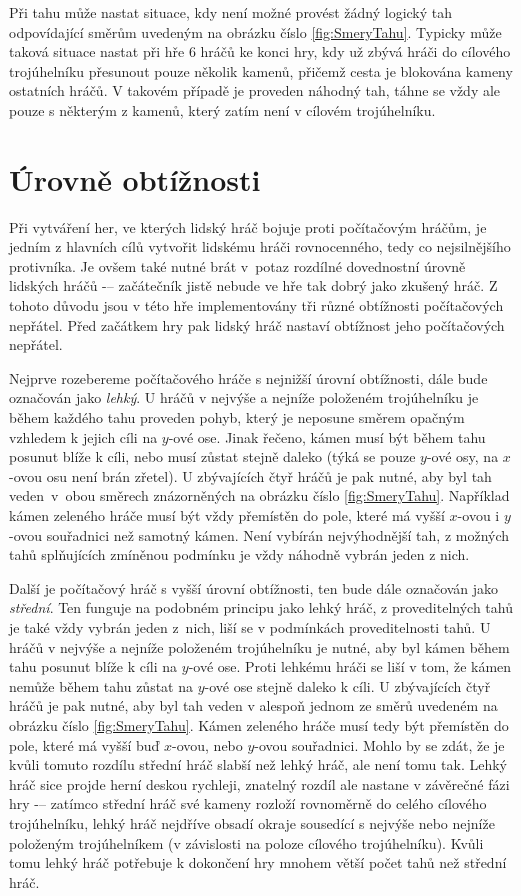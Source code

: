 Při tahu může nastat situace, kdy není možné provést žádný logický tah odpovídající směrům uvedeným na obrázku číslo \ref{fig:SmeryTahu}. Typicky může taková situace nastat při hře 6 hráčů ke konci hry, kdy už zbývá hráči do cílového trojúhelníku přesunout pouze několik kamenů, přičemž cesta je blokována kameny ostatních hráčů. V takovém případě je proveden náhodný tah, táhne se vždy ale pouze s některým z kamenů, který zatím není v cílovém trojúhelníku. 

\section{Úrovně obtížnosti}
\label{sec:UrovneObtiznosti}
Při vytváření her, ve kterých lidský hráč bojuje proti počítačovým hráčům, je jedním z hlavních cílů vytvořit lidskému hráči rovnocenného, tedy co nejsilnějšího protivníka. Je ovšem také nutné brát v~potaz rozdílné dovednostní úrovně lidských hráčů -– začátečník jistě nebude ve hře tak dobrý jako zkušený hráč. Z tohoto důvodu jsou v této hře implementovány tři různé obtížnosti počítačových nepřátel. Před začátkem hry pak lidský hráč nastaví obtížnost jeho počítačových nepřátel.

Nejprve rozebereme počítačového hráče s nejnižší úrovní obtížnosti, dále bude označován jako \emph{lehký}. U hráčů v nejvýše a nejníže položeném trojúhelníku je během každého tahu proveden pohyb, který je neposune směrem opačným vzhledem k jejich cíli na $y$-ové ose. Jinak řečeno, kámen musí být během tahu posunut blíže k cíli, nebo musí zůstat stejně daleko (týká se pouze $y$-ové osy, na $x$-ovou osu není brán zřetel). U zbývajících čtyř hráčů je pak nutné, aby byl tah veden~v~obou směrech znázorněných na obrázku číslo \ref{fig:SmeryTahu}. Například kámen zeleného hráče musí být vždy přemístěn do pole, které má vyšší $x$-ovou i $y$-ovou souřadnici než samotný kámen. Není vybírán nejvýhodnější tah, z možných tahů splňujících zmíněnou podmínku je vždy náhodně vybrán jeden z nich.

Další je počítačový hráč s vyšší úrovní obtížnosti, ten bude dále označován jako \emph{střední}. Ten funguje na podobném principu jako lehký hráč, z proveditelných tahů je také vždy vybrán jeden z~nich, liší se v podmínkách proveditelnosti tahů. U hráčů v nejvýše a nejníže položeném trojúhelníku je nutné, aby byl kámen během tahu posunut blíže k cíli na $y$-ové ose. Proti lehkému hráči se liší v tom, že kámen nemůže během tahu zůstat na $y$-ové ose stejně daleko k cíli. U zbývajících čtyř hráčů je pak nutné, aby byl tah veden v alespoň jednom ze směrů uvedeném na obrázku číslo \ref{fig:SmeryTahu}. Kámen zeleného hráče musí tedy být přemístěn do pole, které má vyšší buď $x$-ovou, nebo $y$-ovou souřadnici. Mohlo by se zdát, že je kvůli tomuto rozdílu střední hráč slabší než lehký hráč, ale není tomu tak. Lehký hráč sice projde herní deskou rychleji, znatelný rozdíl ale nastane v závěrečné fázi hry -– zatímco střední hráč své kameny rozloží rovnoměrně do celého cílového trojúhelníku, lehký hráč nejdříve obsadí okraje sousedící s nejvýše nebo nejníže položeným trojúhelníkem (v závislosti na poloze cílového trojúhelníku). Kvůli tomu lehký hráč potřebuje k dokončení hry mnohem větší počet tahů než střední hráč.

